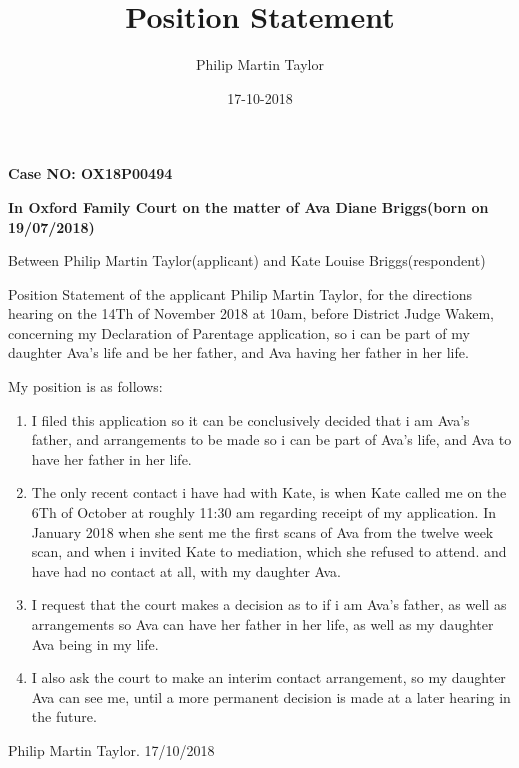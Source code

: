 \documentclass[10pt,a4paper]{book}
\date{17-10-2018}
\author{Philip Martin Taylor}
\title{Position Statement}
\begin{document}
 
\begin{flushright} 
  \textbf{Case NO: OX18P00494}
\end{flushright}
\begin{flushright}
  \textbf{In Oxford Family Court on the matter of Ava Diane Briggs(born on 19/07/2018)}
\end{flushright} 
\begin{flushleft}
  Between Philip Martin Taylor(applicant) and Kate Louise Briggs(respondent)
\end{flushleft} 
\begin{flushleft}
  Position Statement of the applicant Philip Martin Taylor, for the directions hearing on the 14Th of November 2018 at 10am, before District Judge Wakem, concerning my Declaration of Parentage application, so i can be part of my daughter Ava's life and be her father, and Ava having her father in her life.
\end{flushleft}
\begin{flushleft}
  My position is as follows:
\end{flushleft}
\begin{enumerate}
  \item I filed this application so it can be conclusively decided that i am Ava's father, and arrangements to be made so i can be part of Ava's life, and Ava to have her father in her life.
  \item The only recent contact i have had with Kate, is when Kate called me on the 6Th of October at roughly 11:30 am regarding receipt of my application. In January 2018 when she sent me the first scans of Ava from the twelve week scan, and when i invited Kate to mediation, which she refused to attend. and have had no contact at all, with my daughter Ava.
  \item I request that the court makes a decision as to if i am Ava's father, as well as arrangements so Ava can have her father in her life, as well as my daughter Ava being in my life.
    \item I also ask the court to make an interim contact arrangement, so my daughter Ava can see me, until a more permanent decision is made at a later hearing in the future.
\end{enumerate}
\begin{center}
  Philip Martin Taylor. 17/10/2018
\end{center}
\end{document}
